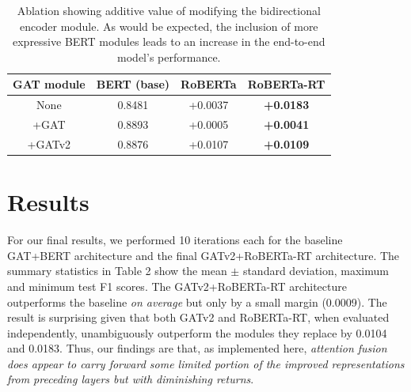 \documentclass[letterpaper]{article} %
\begin{document}
\begin{table}
    \begin{tabular}{|c||c|c|c|}
        \hline
        GAT module & BERT (base) & RoBERTa & RoBERTa-RT  \\
        \hline 
        \hline
        None & 0.8481 & +0.0037 &  \textbf{+0.0183}  \\
        +GAT & 0.8893 & +0.0005 & \textbf{+0.0041} \\
        +GATv2 & 0.8876 & +0.0107 & \textbf{+0.0109} \\
        \hline
    \end{tabular}
    \caption{Ablation showing additive value of modifying the bidirectional encoder module. As would be expected, the inclusion of more expressive BERT modules leads to an increase in the end-to-end model's performance.}
\end{table}

\section{Results}

For our final results, we performed 10 iterations each for the baseline GAT+BERT architecture and the final GATv2+RoBERTa-RT architecture. The summary statistics in Table 2 show the mean $\pm$ standard deviation, maximum and minimum test F1 scores. The GATv2+RoBERTa-RT architecture outperforms the baseline \textit{on average} but only by a small margin (0.0009). The result is surprising given that both GATv2 and RoBERTa-RT, when evaluated independently, unambiguously outperform the modules they replace by 0.0104 and 0.0183. Thus, our findings are that, as implemented here, \textit{attention fusion does appear to carry forward some limited portion of the improved representations from preceding layers but with diminishing returns}. 

\end{document}
